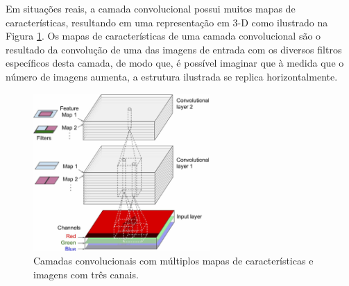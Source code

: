 Em situações reais, a camada convolucional possui muitos mapas de características, resultando
em uma representação em 3-D como ilustrado na Figura \ref{fig:featmaps}. Os mapas de características
de uma camada convolucional são o resultado da convolução de uma das imagens de entrada com os diversos
filtros específicos desta camada, de modo que, é possível imaginar que à medida que o número de imagens aumenta,
a estrutura ilustrada se replica horizontalmente.
\begin{figure}[htp]
\begin{center}
  \includegraphics[width=0.6\textwidth]{fig/feat_maps}
  \caption{Camadas convolucionais com múltiplos mapas de características e imagens com três canais.}
  \label{fig:featmaps}
\end{center}
\end{figure}

